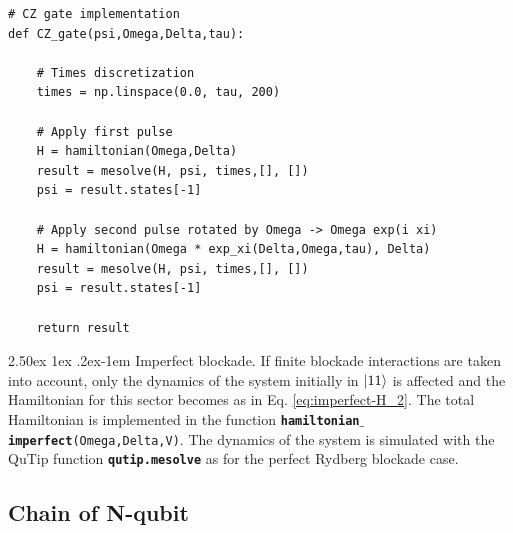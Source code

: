 \documentclass[rmp,10pt,onecolumn,fleqn,notitlepage]{revtex4-1}
\makeatletter
\renewcommand{\paragraph}{%
    \@startsection{paragraph}{4}%
    {\z@}{2.50ex \@plus 1ex \@minus .2ex}{-1em}%
    {\bf\sffamily}%
}
\makeatother
\begin{document}
\begin{lstlisting}[style=myPython]
# CZ gate implementation
def CZ_gate(psi,Omega,Delta,tau):
        
    # Times discretization
    times = np.linspace(0.0, tau, 200)
    
    # Apply first pulse 
    H = hamiltonian(Omega,Delta)
    result = mesolve(H, psi, times,[], [])
    psi = result.states[-1]
    
    # Apply second pulse rotated by Omega -> Omega exp(i xi)
    H = hamiltonian(Omega * exp_xi(Delta,Omega,tau), Delta)
    result = mesolve(H, psi, times,[], [])
    psi = result.states[-1] 
        
    return result
\end{lstlisting}

 
\paragraph{Imperfect blockade.} If finite blockade interactions are taken into account, only the dynamics of the system initially in $\left\vert{11}\right\rangle$ is affected and the Hamiltonian for this sector becomes as in Eq. \eqref{eq:imperfect-H_2}. The total Hamiltonian is implemented in the function {\bfseries\texttt{hamiltonian$\_$imperfect}}\texttt{(Omega,Delta,V)}. The dynamics of the system is simulated with the QuTip function {\bfseries\texttt{qutip.mesolve}} as for the perfect Rydberg blockade case.



\subsection{Chain of N-qubit}
\label{subsec:chain-N-qubit}
\end{document}
